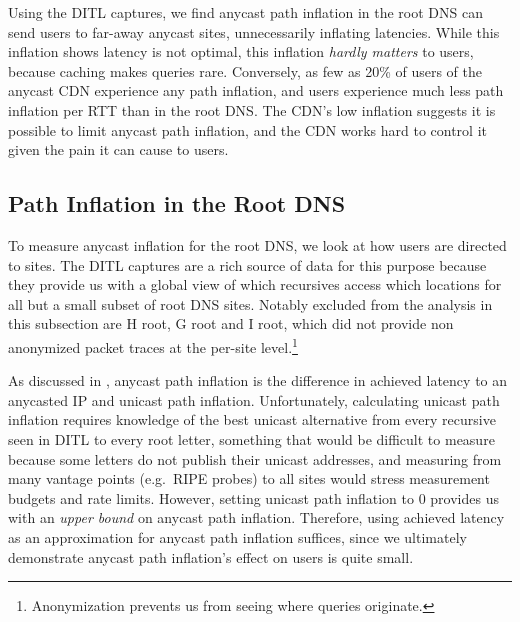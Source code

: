 \documentclass[sigconf,letterpaper,nonacm,10pt,anonymous]{acmart}
\begin{document}
Using the DITL captures, we find anycast path inflation in the root DNS
can send users to far-away anycast sites, unnecessarily inflating
latencies. While this inflation shows latency is not optimal, this
inflation \emph{hardly matters} to users, because caching makes queries
rare. Conversely, as few as 20\% of users of the anycast CDN experience
any path inflation, and users experience much less path inflation per
RTT than in the root DNS. The CDN's low inflation suggests it is
possible to limit anycast path inflation, and the CDN works hard to
control it given the pain it can cause to users.

\subsection{Path Inflation in the Root
DNS}\label{path-inflation-in-the-root-dns}

\label{sec:root_dns_anycast}

To measure anycast inflation for the root DNS, we look at how users are
directed to sites. The DITL captures are a rich source of data for this
purpose because they provide us with a global view of which recursives
access which locations for all but a small subset of root DNS sites.
Notably excluded from the analysis in this subsection are H root, G root
and I root, which did not provide non anonymized packet traces at the
per-site level.\footnote{Anonymization prevents us from seeing where
  queries originate.}

As discussed in , anycast path
inflation is the difference in achieved latency to an anycasted IP and
unicast path inflation. Unfortunately, calculating unicast path
inflation requires knowledge of the best unicast alternative from every
recursive seen in DITL to every root letter, something that would be
difficult to measure because some letters do not publish their unicast
addresses, and measuring from many vantage points (e.g.~RIPE probes) to
all sites would stress measurement budgets and rate limits. However,
setting unicast path inflation to 0 provides us with an
\emph{upper bound} on anycast path inflation. Therefore, using achieved
latency as an approximation for anycast path inflation suffices, since
we ultimately demonstrate anycast path inflation's effect on users is
quite small.
\end{document}
